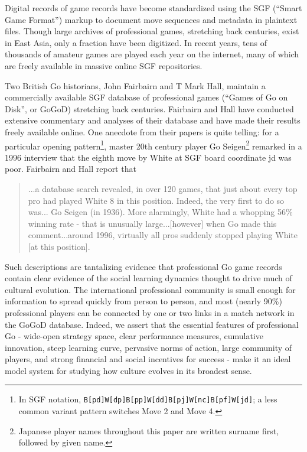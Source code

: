 Digital records of game records have become standardized using the SGF (``Smart Game Format'') markup to document move sequences and metadata in plaintext files.  Though large archives of professional games, stretching back centuries, exist in East Asia, only a fraction have been digitized.  In recent years, tens of thousands of amateur games are played each year on the internet, many of which are freely available in massive online SGF repositories.    

Two British Go historians, John Fairbairn and T Mark Hall, maintain a commercially available SGF database of professional games (``Games of Go on Disk'', or GoGoD) stretching back centuries.  Fairbairn and Hall have conducted extensive commentary and analyses of their database and have made their results freely available online.  One anecdote from their papers is quite telling: for a particular opening pattern\footnote{In SGF notation, \texttt{B[pd]W[dp]B[pp]W[dd]B[pj]W[nc]B[pf]W[jd]}; a less common variant pattern switches Move 2 and Move 4.}, master 20th century player Go Seigen\footnote{Japanese player names throughout this paper are written surname first, followed by given name.} remarked in a 1996 interview that the eighth move by White at SGF board coordinate jd was poor.  Fairbairn and Hall report that 

\begin{quote}
...a database search revealed, in over 120 games, that just about every top pro had played White 8 in this position. Indeed, the very first to do so was... Go Seigen (in 1936). More alarmingly, White had a whopping 56\% winning rate - that is unusually large...[however] when Go made this comment...around 1996, virtually all pros suddenly stopped playing White [at this position]. \citep{Fairbairn2009}
\end{quote}

Such descriptions are tantalizing evidence that professional Go game records contain clear evidence of the social learning dynamics thought to drive much of cultural evolution.  The international professional community is small enough for information to spread quickly from person to person, and most (nearly 90\%) professional players can be connected by one or two links in a match network in the GoGoD database.  Indeed, we assert that the essential features of professional Go - wide-open strategy space, clear performance measures, cumulative innovation, steep learning curve, pervasive norms of action, large community of players, and strong financial and social incentives for success - make it an ideal model system for studying how culture evolves in its broadest sense.  

